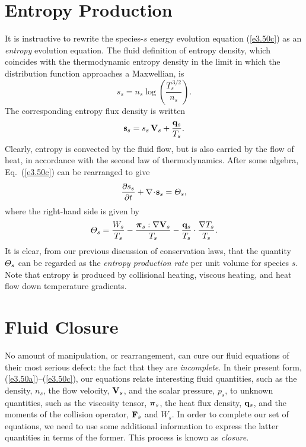 \section{Entropy Production}
It is instructive to rewrite the species-$s$ energy evolution  equation (\ref{e3.50c}) as
an {\em entropy}\/ evolution equation. The fluid definition of entropy
density, which coincides with the thermodynamic entropy density in the 
limit in which the distribution function approaches a Maxwellian, is
\begin{equation}\label{entropy}
s_s = n_s\log\!\left(\frac{T_s^{~3/2}}{n_s}\right).
\end{equation}
The corresponding entropy flux density is written
\begin{equation}
{\bf s}_s = s_s\,{\bf V}_s + \frac{{\bf q}_s}{T_s}.
\end{equation}
Clearly, entropy is convected by the fluid flow, but is also carried by the
flow of heat, in accordance with the second law of thermodynamics. After some
algebra, Eq.~(\ref{e3.50c}) can be rearranged to give
\begin{equation}
\frac{\partial s_s}{\partial t} + \nabla\!\cdot\!{\bf s}_s = {\mit\Theta}_s,
\end{equation}
where the right-hand side is given by
\begin{equation}
{\mit\Theta}_s = \frac{W_s}{T_s} - \frac{\bpi_s : \nabla {\bf V}_s}{T_s}
- \frac{{\bf q}_s}{T_s} \cdot \frac{\nabla T_s}{T_s}.
\end{equation}
It is clear, from our previous discussion of conservation laws, that the
quantity ${\mit\Theta}_s$ can be regarded as the {\em entropy production rate}\/
per unit volume for species $s$. Note that entropy is produced by
collisional heating, viscous heating, and heat flow down temperature
gradients.

\section{Fluid Closure}\label{s3.7}
No amount of manipulation, or rearrangement, can cure our fluid equations
of their most serious defect: the fact that they are {\em incomplete}. 
In their present form, (\ref{e3.50a})--(\ref{e3.50c}), our equations
relate interesting fluid quantities, such as the density, $n_s$, the
flow velocity, ${\bf V}_s$, and the scalar pressure, $p_s$, to unknown quantities,
such as the viscosity tensor, $\mbox{\boldmath$\pi$}_s$, the heat flux
density, ${\bf q}_s$, and the
moments of the collision operator, ${\bf F}_s$ and $W_s$. In order to complete
our set of equations, we need to use some additional information to express the
latter quantities in terms of the former. This process is known as {\em closure}. 

